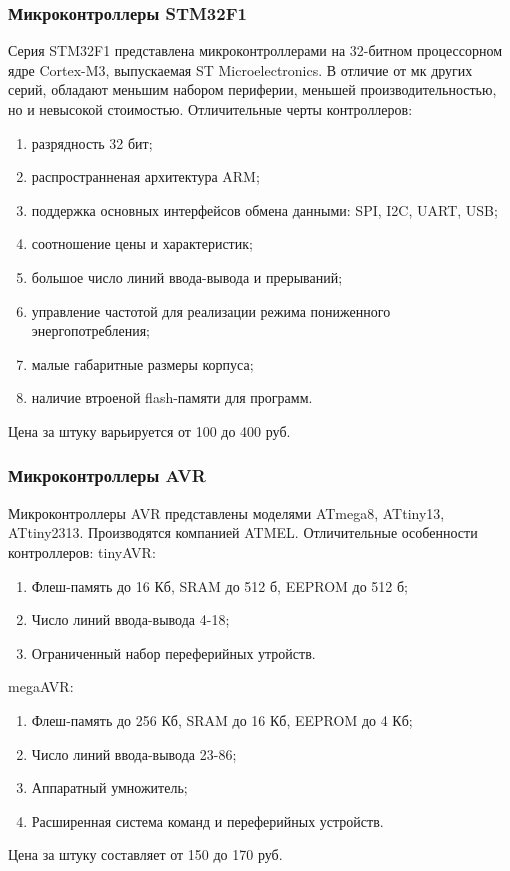 \documentclass[12pt, a4paper] {article}
\begin{document}
\subsubsection*{Микроконтроллеры STM32F1}
Серия STM32F1 представлена микроконтроллерами на 32-битном
процессорном ядре Cortex-M3, выпускаемая ST Microelectronics. В отличие от
мк других серий, обладают меньшим набором периферии, меньшей
производительностью, но и невысокой стоимостью.
Отличительные черты контроллеров:
\begin{enumerate}
  \item разрядность 32 бит;
  \item распространненая архитектура ARM;
  \item поддержка основных интерфейсов обмена данными: SPI, I2C, UART, USB;
  \item соотношение цены и характеристик;
  \item большое число линий ввода-вывода и прерываний;
  \item управление частотой для реализации режима пониженного энергопотребления;
  \item малые габаритные размеры корпуса;
  \item наличие втроеной flash-памяти для программ.
\end{enumerate}
Цена за штуку варьируется от 100 до 400 руб.
\subsubsection*{Микроконтроллеры AVR}
Микроконтроллеры AVR представлены моделями ATmega8, ATtiny13, 
ATtiny2313. Производятся компанией ATMEL. Отличительные особенности 
контроллеров:
tinyAVR:
\begin{enumerate}
  \item Флеш-память до 16 Кб, SRAM до 512 б, EEPROM до 512 б;
  \item Число линий ввода-вывода 4-18;
  \item Ограниченный набор переферийных утройств.
\end{enumerate}

megaAVR:
\begin{enumerate}
  \item Флеш-память до 256 Кб, SRAM до 16 Кб, EEPROM до 4 Кб;
  \item Число линий ввода-вывода 23-86;
  \item Аппаратный умножитель;
  \item Расширенная система команд и переферийных устройств.
\end{enumerate}
Цена за штуку составляет от 150 до 170 руб.
\end{document}
